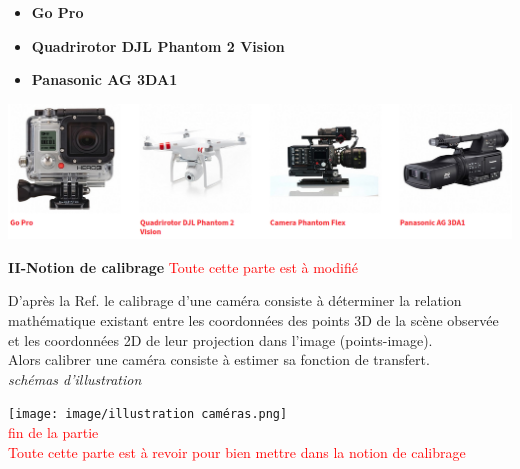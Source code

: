 \documentclass[12pt,a4paper]{report}
\begin{document}
\begin{itemize}
	\begin{itemize}
		\item \textbf{Go Pro}\\
		
		\item \textbf{Quadrirotor DJL Phantom 2 Vision}\\
		
		\item \textbf{Panasonic AG 3DA1}\\		 
	\end{itemize}
	\includegraphics[scale=0.38]{image/caméras dedié.png} \\	
\end{itemize}









\newpage

\begin{center}
	\textbf{II-Notion de calibrage}	\textcolor{red}{Toute cette parte est à modifié}
\end{center}


D'après la Ref.\cite{orteu_calibrage_nodate} le calibrage d'une caméra consiste à déterminer la relation mathématique existant entre les coordonnées des points 3D de la scène observée et les coordonnées 2D de leur projection dans l'image (points-image).\\
Alors calibrer une caméra consiste à estimer sa fonction de transfert.\\

\textit{schémas d'illustration\\}

\texttt{[image: image/illustration caméras.png]} \\
 \textcolor{red}{fin de la partie}\\

   \textcolor{red}{Toute cette parte est à revoir pour bien mettre dans la notion de calibrage}\\
   
\end{document}
